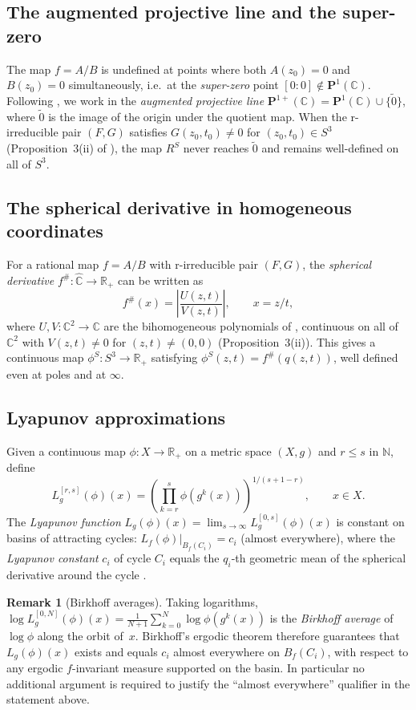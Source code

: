 \documentclass[12pt]{article}
\theoremstyle{definition}
\newtheorem{remark}[theorem]{Remark}
\newcommand{\C}{\mathbb{C}}
\newcommand{\R}{\mathbb{R}}
\newcommand{\N}{\mathbb{N}}
\newcommand{\Chat}{\hat{\C}}
\newcommand{\Pone}{\mathbf{P}^1(\C)}
\newcommand{\Poneplus}{\mathbf{P}^{1+}(\C)}
\newcommand{\fsh}{f^{\#}}            %
\newcommand{\RS}{R^S}
\begin{document}
\subsection{The augmented projective line and the super-zero}

The map $f = A/B$ is undefined at points where both $A(z_0) = 0$ and
$B(z_0) = 0$ simultaneously, i.e.~at the \emph{super-zero} point
$[0:0] \notin \Pone$.  Following \cite[Def.~9]{Alvarez2023}, we work
in the \emph{augmented projective line}
$\Poneplus = \Pone \cup \{\tilde{0}\}$,
where $\tilde{0}$ is the image of the origin under the quotient map.  When
the r-irreducible pair $(F,G)$ satisfies $G(z_0,t_0) \ne 0$ for
$(z_0,t_0) \in S^3$ (Proposition~3(ii) of \cite{Alvarez2023}), the map
$\RS$ never reaches $\tilde{0}$ and remains well-defined on all of $S^3$.

\subsection{The spherical derivative in homogeneous coordinates}

For a rational map $f = A/B$ with r-irreducible pair $(F,G)$, the
\emph{spherical derivative} $\fsh: \Chat \to \R_+$ can be written as
\[
  \fsh(x) = \left|\frac{U(z,t)}{V(z,t)}\right|, \qquad x = z/t,
\]
where $U, V: \C^2 \to \C$ are the bihomogeneous polynomials of
\cite[Def.~16]{Alvarez2023}, continuous on all of $\C^2$ with $V(z,t)\ne
0$ for $(z,t)\ne(0,0)$ (Proposition~3(ii)).  This gives a continuous
map $\phi^S: S^3 \to \R_+$ satisfying $\phi^S(z,t) = \fsh(q(z,t))$,
well defined even at poles and at $\infty$.

\subsection{Lyapunov approximations}

Given a continuous map $\phi: X \to \R_+$ on a metric space $(X,g)$ and
$r \le s$ in $\N$, define
\[
  L_g^{[r,s]}(\phi)(x)
  = \left(\prod_{k=r}^{s} \phi(g^k(x))\right)^{1/(s+1-r)},
  \qquad x \in X.
\]
The \emph{Lyapunov function} $L_g(\phi)(x) = \lim_{s\to\infty}
L_g^{[0,s]}(\phi)(x)$ is constant on basins of attracting cycles:
$L_f(\phi)|_{B_f(C_i)} = c_i$ (almost everywhere), where the \emph{Lyapunov
constant} $c_i$ of cycle $C_i$ equals the $q_i$-th geometric mean of the
spherical derivative around the cycle \cite[Prop.~5]{Alvarez2023}.

\begin{remark}[Birkhoff averages]\label{rem:birkhoff}
Taking logarithms, $\log L_g^{[0,N]}(\phi)(x) = \frac{1}{N+1}\sum_{k=0}^{N}
\log\phi(g^k(x))$ is the \emph{Birkhoff average} of $\log\phi$ along the
orbit of~$x$.  Birkhoff's ergodic theorem \cite{Birkhoff1931} therefore guarantees that
$L_g(\phi)(x)$ exists and equals $c_i$ almost everywhere on $B_f(C_i)$,
with respect to any ergodic $f$-invariant measure supported on the basin.
In particular no additional argument is required to justify the ``almost
everywhere'' qualifier in the statement above.
\end{remark}
\end{document}
